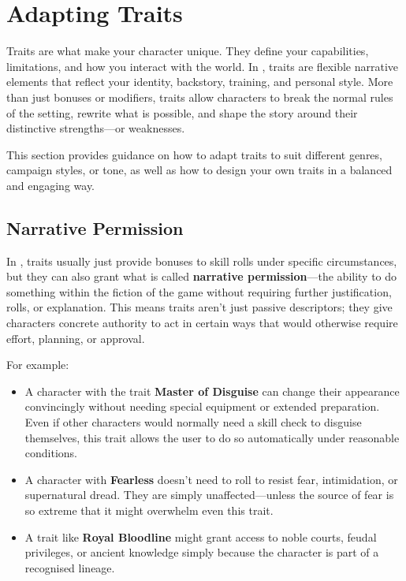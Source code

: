 \section{Adapting Traits}\label{toolbox:sec:adapting-traits}

Traits are what make your character unique. They define your capabilities, limitations, and how you interact with the world. In \wyrd, traits are flexible narrative elements that reflect your identity, backstory, training, and personal style. More than just bonuses or modifiers, traits allow characters to break the normal rules of the setting, rewrite what is possible, and shape the story around their distinctive strengths—or weaknesses.

This section provides guidance on how to adapt traits to suit different genres, campaign styles, or tone, as well as how to design your own traits in a balanced and engaging way.

\subsection{Narrative Permission}

In \wyrd, traits usually just provide bonuses to skill rolls under specific circumstances, but they can also grant what is called \textbf{narrative permission}—the ability to do something within the fiction of the game without requiring further justification, rolls, or explanation. This means traits aren't just passive descriptors; they give characters concrete authority to act in certain ways that would otherwise require effort, planning, or approval.

For example:
\begin{itemize}
    \item A character with the trait \textbf{Master of Disguise} can change their appearance convincingly without needing special equipment or extended preparation. Even if other characters would normally need a skill check to disguise themselves, this trait allows the user to do so automatically under reasonable conditions.
    \item A character with \textbf{Fearless} doesn't need to roll to resist fear, intimidation, or supernatural dread. They are simply unaffected—unless the source of fear is so extreme that it might overwhelm even this trait.
    \item A trait like \textbf{Royal Bloodline} might grant access to noble courts, feudal privileges, or ancient knowledge simply because the character is part of a recognised lineage.
\end{itemize}

